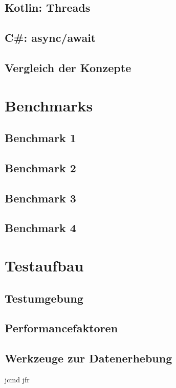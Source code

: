 \documentclass[fontsize=12pt,paper=a4,twoside=semi,parskip=half-,headsepline,headinclude]{scrreprt}
\begin{document}
\section{Kotlin: Threads}

\section{C\#: async/await}

\section{Vergleich der Konzepte}



\chapter{Benchmarks}

\section{Benchmark 1}

\section{Benchmark 2}

\section{Benchmark 3}

\section{Benchmark 4}



\chapter{Testaufbau}

\section{Testumgebung}

\section{Performancefaktoren}

\section{Werkzeuge zur Datenerhebung}
jcmd
jfr
\end{document}
